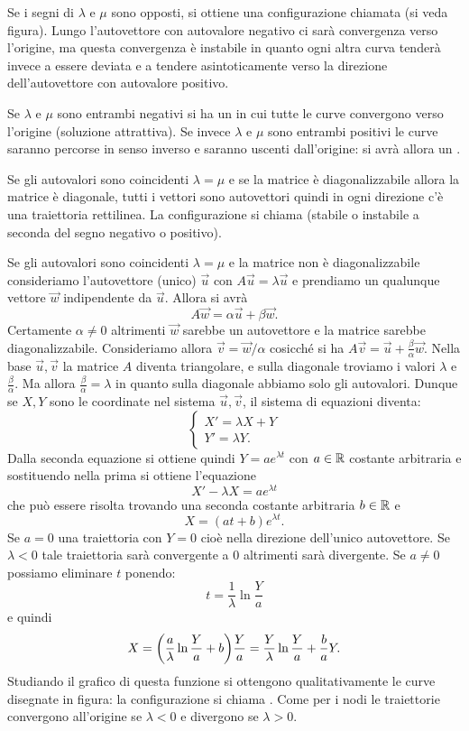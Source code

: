 Se i segni di $\lambda$ e $\mu$ sono opposti,
si ottiene una configurazione chiamata
 (si veda figura).
Lungo l'autovettore con autovalore negativo
ci sarà convergenza verso l'origine, ma questa
convergenza è instabile in quanto ogni altra
curva tenderà invece a essere deviata
e a tendere asintoticamente verso la direzione
dell'autovettore con autovalore positivo.

Se $\lambda$ e $\mu$ sono entrambi negativi si
ha un  in cui tutte le
curve convergono verso l'origine (soluzione
attrattiva). Se invece $\lambda$ e $\mu$
sono entrambi positivi le curve
saranno percorse in senso inverso e saranno
uscenti dall'origine: si avrà allora
un .

Se gli autovalori sono coincidenti $\lambda=\mu$
e se la matrice è diagonalizzabile allora
la matrice è diagonale, tutti i vettori sono
autovettori quindi in ogni direzione c'è
una traiettoria rettilinea.
La configurazione si
chiama  (stabile o instabile a seconda
del segno negativo o positivo).

Se gli autovalori sono coincidenti $\lambda = \mu$ e la matrice
non è diagonalizzabile consideriamo l'autovettore (unico)
$\vec u$ con $A \vec u = \lambda \vec u$
e prendiamo un qualunque vettore $\vec w$
indipendente da $\vec u$. Allora si avrà
\[
  A \vec w = \alpha \vec u + \beta \vec w.
\]
Certamente $\alpha \neq 0$ altrimenti $\vec w$
sarebbe un autovettore e la matrice sarebbe diagonalizzabile.
Consideriamo allora $\vec v = \vec w / \alpha$
cosicché si ha $A \vec v = \vec u + \frac{\beta}{\alpha} \vec w$.
Nella base $\vec u, \vec v$ la matrice $A$ diventa
triangolare, e sulla diagonale troviamo i valori $\lambda$
e $\frac{\beta}{\alpha}$.
Ma allora $\frac{\beta}{\alpha} = \lambda$ in quanto sulla diagonale
abbiamo solo gli autovalori. Dunque se $X,Y$ sono le coordinate nel
sistema $\vec u, \vec v$, il sistema di equazioni diventa:
\[
\begin{cases}
X' = \lambda X + Y \\
Y' = \lambda Y.
\end{cases}
\]
Dalla seconda equazione si ottiene quindi $Y = a e^{\lambda t}$
con $a\in \mathbb R$ costante arbitraria
e sostituendo nella prima si ottiene l'equazione
\[
  X' - \lambda X = a e^{\lambda t}
\]
che può essere risolta trovando una seconda costante arbitraria $b\in \mathbb R$ e
\[
  X = (at+b) e^{\lambda t}.
\]
Se $a=0$ una traiettoria con $Y=0$ cioè nella direzione dell'unico autovettore.
Se $\lambda <0$ tale traiettoria sarà convergente a $0$ altrimenti sarà divergente.
Se $a\neq 0$ possiamo eliminare $t$ ponendo:
\[
  t = \frac 1 \lambda \ln \frac{Y}{a}
\]
e quindi
\[
  X = {\left( \frac{a}{\lambda} \ln \frac{Y}{a}+ b \right)} \frac{Y}{a}
  =  \frac{Y}{\lambda}\ln \frac{Y}{a}+ \frac{b}{a}Y.
\]
Studiando il grafico di questa funzione si ottengono qualitativamente
le curve disegnate in figura: la configurazione si chiama .
Come per i nodi le traiettorie convergono all'origine se $\lambda < 0$ e
divergono se $\lambda >0$.

